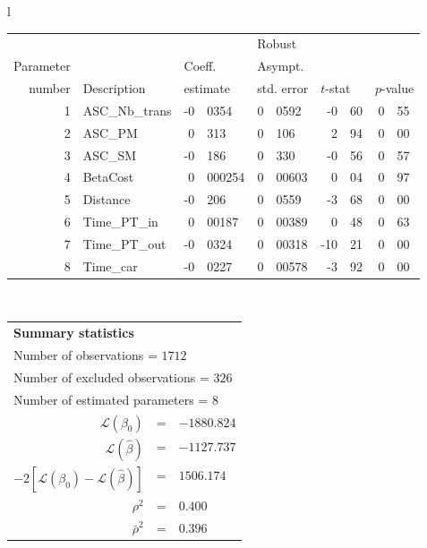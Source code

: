   \begin{tabular}{l}
\begin{tabular}{rlr@{.}lr@{.}lr@{.}lr@{.}l}
         &                       &   \multicolumn{2}{l}{}    & \multicolumn{2}{l}{Robust}  &     \multicolumn{4}{l}{}   \\
Parameter &                       &   \multicolumn{2}{l}{Coeff.}      & \multicolumn{2}{l}{Asympt.}  &     \multicolumn{4}{l}{}   \\
number &  Description                     &   \multicolumn{2}{l}{estimate}      & \multicolumn{2}{l}{std. error}  &   \multicolumn{2}{l}{$t$-stat}  &   \multicolumn{2}{l}{$p$-value}   \\

\hline

1 & ASC_Nb_trans & -0&0354 & 0&0592 & -0&60 & 0&55\\
2 & ASC_PM  & 0&313 & 0&106 & 2&94 & 0&00\\
3 & ASC_SM & -0&186 & 0&330 & -0&56 & 0&57\\
4 & BetaCost & 0&000254 & 0&00603 & 0&04 & 0&97\\
5 & Distance & -0&206 & 0&0559 & -3&68 & 0&00\\
6 & Time_PT_in & 0&00187 & 0&00389 & 0&48 & 0&63\\
7 & Time_PT_out & -0&0324 & 0&00318 & -10&21 & 0&00\\
8 & Time_car & -0&0227 & 0&00578 & -3&92 & 0&00\\
\hline
\end{tabular}
\\
\begin{tabular}{rcl}
\multicolumn{3}{l}{\bf Summary statistics}\\
\multicolumn{3}{l}{ Number of observations = $1712$} \\
\multicolumn{3}{l}{ Number of excluded observations = $326$} \\
\multicolumn{3}{l}{ Number of estimated  parameters = $8$} \\
 $\mathcal{L}(\beta_0)$ &=&  $-1880.824$ \\
 $\mathcal{L}(\hat{\beta})$ &=& $-1127.737 $  \\
 $-2[\mathcal{L}(\beta_0) -\mathcal{L}(\hat{\beta})]$ &=& $1506.174$ \\
    $\rho^2$ &=&   $0.400$ \\
    $\bar{\rho}^2$ &=&    $0.396$ \\
\end{tabular}
  \end{tabular}
